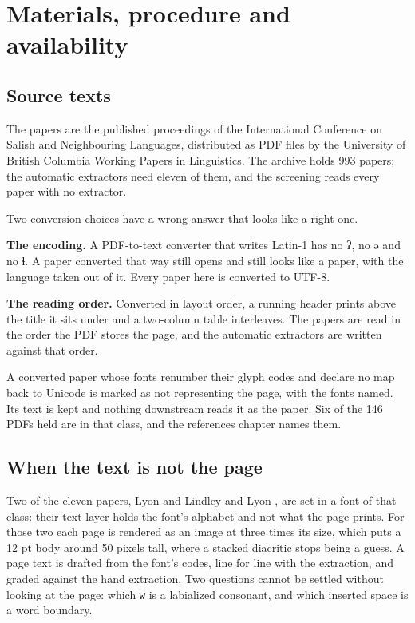 \chapter{Materials, procedure and availability}

\section{Source texts}

The papers are the published proceedings of the International Conference on Salish and Neighbouring
Languages, distributed as PDF files by the University of British Columbia Working Papers in
Linguistics. The archive holds 993 papers; the automatic extractors need eleven of them, and the
screening reads every paper with no extractor.

Two conversion choices have a wrong answer that looks like a right one.

\textbf{The encoding.} A PDF-to-text converter that writes Latin-1 has no ʔ, no ə and no ɬ. A paper
converted that way still opens and still looks like a paper, with the language taken out of it.
Every paper here is converted to UTF-8.

\textbf{The reading order.} Converted in layout order, a running header prints above the title it
sits under and a two-column table interleaves. The papers are read in the order the PDF stores the
page, and the automatic extractors are written against that order.

A converted paper whose fonts renumber their glyph codes and declare no map back to Unicode is
marked as not representing the page, with the fonts named. Its text is kept and nothing downstream
reads it as the paper. Six of the 146 PDFs held are in that class, and the references chapter
names them.

\section{When the text is not the page}

Two of the eleven papers, Lyon \cite{src:Lyon-2015} and Lindley and Lyon \cite{src:Lindley-and-Lyon-2013},
are set in a font of that class: their text layer holds the font's alphabet and not what the page
prints. For those two each page is rendered as an image at three times its size, which puts a 12 pt
body around 50 pixels tall, where a stacked diacritic stops being a guess. A page text is drafted
from the font's codes, line for line with the extraction, and graded against the hand extraction.
Two questions cannot be settled without looking at the page: which \texttt{w} is a labialized
consonant, and which inserted space is a word boundary.

